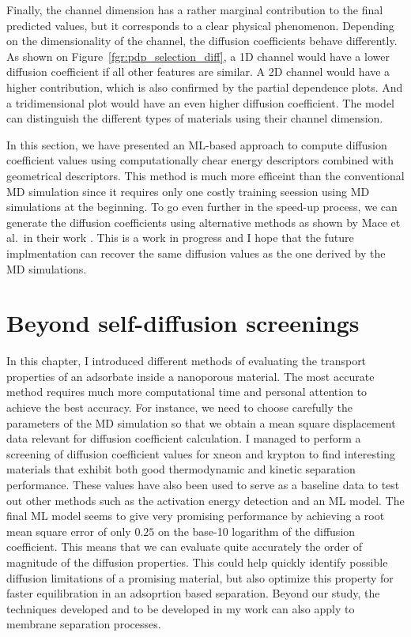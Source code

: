 \documentclass[main]{subfiles}
\begin{document}
Finally, the channel dimension has a rather marginal contribution to the final predicted values, but it corresponds to a clear physical phenomenon. Depending on the dimensionality of the channel, the diffusion coefficients behave differently. As shown on Figure~\ref{fgr:pdp_selection_diff}, a 1D channel would have a lower diffusion coefficient if all other features are similar. A 2D channel would have a higher contribution, which is also confirmed by the partial dependence plots. And a tridimensional plot would have an even higher diffusion coefficient. The model can distinguish the different types of materials using their channel dimension.

In this section, we have presented an ML-based approach to compute diffusion coefficient values using computationally chear energy descriptors combined with geometrical descriptors. This method is much more efficeint than the conventional MD simulation since it requires only one costly training seession using MD simulations at the beginning. To go even further in the speed-up process, we can generate the diffusion coefficients using alternative methods as shown by Mace et al.\ in their work \autocite{Mace_2019}. This is a work in progress and I hope that the future implmentation can recover the same diffusion values as the one derived by the MD simulations.

\clearpage
\section{Beyond self-diffusion screenings}

In this chapter, I introduced different methods of evaluating the transport properties of an adsorbate inside a nanoporous material. The most accurate method requires much more computational time and personal attention to achieve the best accuracy. For instance, we need to choose carefully the parameters of the MD simulation so that we obtain a mean square displacement data relevant for diffusion coefficient calculation. I managed to perform a screening of diffusion coefficient values for xneon and krypton to find interesting materials that exhibit both good thermodynamic and kinetic separation performance. These values have also been used to serve as a baseline data to test out other methods such as the activation energy detection and an ML model. The final ML model seems to give very promising performance by achieving a root mean square error of only $0.25$ on the base-10 logarithm of the diffusion coefficient. This means that we can evaluate quite accurately the order of magnitude of the diffusion properties. This could help quickly identify possible diffusion limitations of a promising material, but also optimize this property for faster equilibration in an adsoprtion based separation. Beyond our study, the techniques developed and to be developed in my work can also apply to membrane separation processes.
\end{document}
